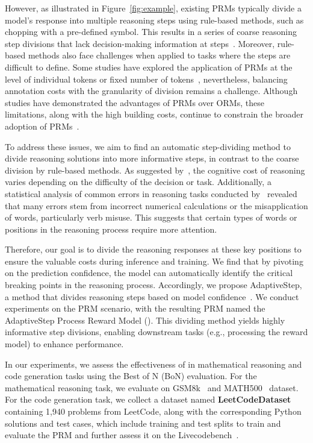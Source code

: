 However, as illustrated in Figure~\ref{fig:example}, existing PRMs typically divide a model's response into multiple reasoning steps using rule-based methods, such as chopping with a pre-defined symbol. This results in a series of coarse reasoning step divisions that lack decision-making information at steps~\cite{wang2024mathshepherdverifyreinforcellms, lightman2023letsverifystepstep}. Moreover, rule-based methods also face challenges when applied to tasks where the steps are difficult to define. Some studies have explored the application of PRMs at the level of individual tokens or fixed number of tokens~\cite{lee2024tokensupervisedvaluemodelsenhancing, luo2024improvemathematicalreasoninglanguage}, nevertheless, balancing annotation costs with the granularity of division remains a challenge. Although studies have demonstrated the advantages of PRMs over ORMs, these limitations, along with the high building costs, continue to constrain the broader adoption of PRMs~\cite{deepseekai2025deepseekr1incentivizingreasoningcapability}.

To address these issues, we aim to find an automatic step-dividing method to divide reasoning solutions into more informative steps, in contrast to the coarse division by rule-based methods. As suggested by~\citet{kahneman2011thinking}, the cognitive cost of reasoning varies depending on the difficulty of the decision or task. Additionally, a statistical analysis of common errors in reasoning tasks conducted by~\citet{roy2016solvinggeneralarithmeticword} revealed that many errors stem from incorrect numerical calculations or the misapplication of words, particularly verb misuse. This suggests that certain types of words or positions in the reasoning process require more attention.



Therefore, our goal is to divide the reasoning responses at these key positions to ensure the valuable costs during inference and training. 
We find that by pivoting on the prediction confidence, the model can automatically identify the critical breaking points in the reasoning process. 
Accordingly, we propose AdaptiveStep, a method that divides reasoning steps based on model confidence~\cite{Hills2024usinglogprobs}. We conduct experiments on the PRM scenario, with the resulting PRM named the AdaptiveStep Process Reward Model (\MethodName). This dividing method yields highly informative step divisions, enabling downstream tasks (e.g., processing the reward model) to enhance performance.

In our experiments, we assess the effectiveness of \MethodName \hspace{1pt} in mathematical reasoning and code generation tasks using the Best of N (BoN) evaluation. For the mathematical reasoning task, we 
evaluate on GSM8k~\cite{cobbe2021trainingverifierssolvemath} and MATH500~\cite{lightman2023letsverifystepstep} dataset.
For the code generation task, we collect a dataset named \textbf{LeetCodeDataset} containing 1,940 problems from LeetCode, along with the corresponding Python solutions and test cases, which include training and test splits to train and evaluate the PRM and further assess it on the Livecodebench~\cite{jain2024livecodebench}.  


